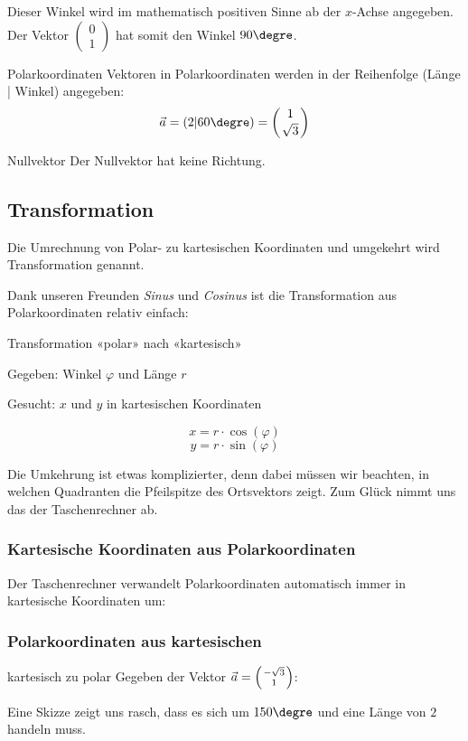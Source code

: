 
Dieser Winkel wird im mathematisch positiven Sinne ab der $x$-Achse
angegeben. Der Vektor
$\begin{pmatrix}0\\1\end{pmatrix}$ hat somit den Winkel $90\degre$.
  \begin{definition}{Polarkoordinaten}{}
    Vektoren in Polarkoordinaten werden in der Reihenfolge (Länge |
    Winkel) angegeben:
    $$\vec{a} = (2 | 60\degre) = \left(1\atop \sqrt{3}\right)$$
    \end{definition}
  \begin{bemerkung}{Nullvektor}{}
    Der Nullvektor hat keine Richtung.
    \end{bemerkung}
  \newpage
\subsection{Transformation}
  Die Umrechnung von Polar- zu kartesischen
  Koordinaten und umgekehrt wird Transformation genannt.
  
  Dank unseren Freunden \textit{Sinus} und \textit{Cosinus} ist die
  Transformation aus Polarkoordinaten relativ einfach:
  \begin{rezept}{Transformation «polar» nach «kartesisch»}{}

    Gegeben:  Winkel $\varphi$ und Länge $r$

    Gesucht: $x$ und $y$ in kartesischen Koordinaten

    $$x = r\cdot{}\cos(\varphi)$$
    $$y = r\cdot{}\sin(\varphi)$$
  \end{rezept}

  Die Umkehrung ist etwas komplizierter, denn dabei müssen wir
  beachten, in welchen Quadranten die Pfeilspitze des Ortsvektors
  zeigt.
  Zum Glück nimmt uns das der Taschenrechner ab.

  \subsubsection{Kartesische Koordinaten aus Polarkoordinaten}
  Der Taschenrechner verwandelt Polarkoordinaten automatisch immer in
  kartesische Koordinaten um:

    \newpage

    
  \subsubsection{Polarkoordinaten aus kartesischen}
  \begin{beispiel}{kartesisch zu polar}{}
    Gegeben der Vektor $\vec{a} = \left(-\sqrt{3} \atop 1\right)$:

    Eine Skizze zeigt uns rasch, dass es sich um $150\degre$ und eine
    Länge von $2$ handeln muss.

    \end{beispiel}

